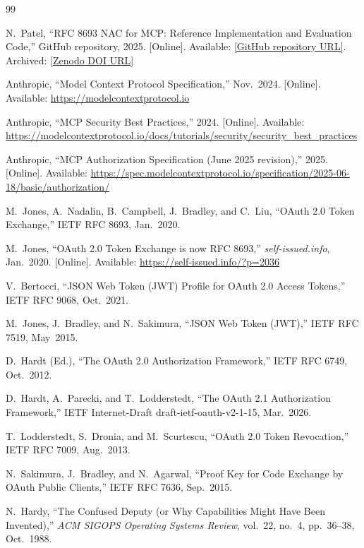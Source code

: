 \documentclass[journal]{IEEEtran}
\theoremstyle{definition}
\begin{document}
\begin{thebibliography}{99}

N.~Patel,
``RFC 8693 NAC for MCP: Reference Implementation and Evaluation Code,''
GitHub repository, 2025.
[Online]. Available: \url{[GitHub repository URL]}.
Archived: \url{[Zenodo DOI URL]}

Anthropic, ``Model Context Protocol Specification,'' Nov.\ 2024.
[Online]. Available: \url{https://modelcontextprotocol.io}

Anthropic, ``MCP Security Best Practices,'' 2024.
[Online]. Available:
\url{https://modelcontextprotocol.io/docs/tutorials/security/security_best_practices}

Anthropic, ``MCP Authorization Specification (June 2025 revision),'' 2025.
[Online]. Available:
\url{https://spec.modelcontextprotocol.io/specification/2025-06-18/basic/authorization/}

M.\ Jones, A.\ Nadalin, B.\ Campbell, J.\ Bradley, and C.\ Liu,
``OAuth 2.0 Token Exchange,'' IETF RFC 8693, Jan.\ 2020.

M.\ Jones, ``OAuth 2.0 Token Exchange is now RFC 8693,''
\textit{self-issued.info}, Jan.\ 2020.
[Online]. Available: \url{https://self-issued.info/?p=2036}

V.\ Bertocci,
``JSON Web Token (JWT) Profile for OAuth 2.0 Access Tokens,''
IETF RFC 9068, Oct.\ 2021.

M.\ Jones, J.\ Bradley, and N.\ Sakimura,
``JSON Web Token (JWT),'' IETF RFC 7519, May\ 2015.

D.\ Hardt (Ed.),
``The OAuth 2.0 Authorization Framework,'' IETF RFC 6749, Oct.\ 2012.

D.\ Hardt, A.\ Parecki, and T.\ Lodderstedt,
``The OAuth 2.1 Authorization Framework,''
IETF Internet-Draft draft-ietf-oauth-v2-1-15, Mar.\ 2026.

T.\ Lodderstedt, S.\ Dronia, and M.\ Scurtescu,
``OAuth 2.0 Token Revocation,'' IETF RFC 7009, Aug.\ 2013.

N.\ Sakimura, J.\ Bradley, and N.\ Agarwal,
``Proof Key for Code Exchange by OAuth Public Clients,''
IETF RFC 7636, Sep.\ 2015.

N.\ Hardy,
``The Confused Deputy (or Why Capabilities Might Have Been Invented),''
\textit{ACM SIGOPS Operating Systems Review},
vol.\ 22, no.\ 4, pp.\ 36--38, Oct.\ 1988.


\end{thebibliography}
\end{document}
